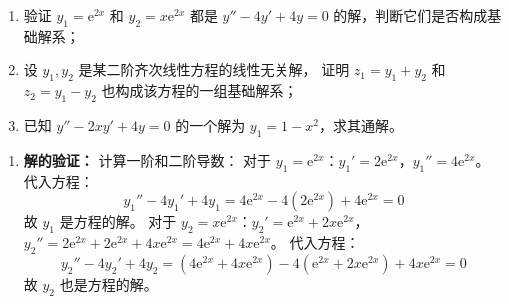 \documentclass[lang=cn,11pt]{elegantbook}
\begin{document}
\begin{exercise}[基础：验证与判定]
\begin{enumerate}
  \item[(1)] 验证 $y_1=\mathrm{e}^{2x}$ 和 $y_2=x\mathrm{e}^{2x}$ 都是
        $y''-4y'+4y=0$ 的解，判断它们是否构成基础解系；
  \item[(2)] 设 $y_1,y_2$ 是某二阶齐次线性方程的线性无关解，
        证明 $z_1=y_1+y_2$ 和 $z_2=y_1-y_2$ 也构成该方程的一组基础解系；
  \item[(3)] 已知 $y''-2xy'+4y=0$ 的一个解为 $y_1=1-x^2$，求其通解。
\end{enumerate}
\end{exercise}
\begin{solution}
\begin{enumerate}
  \item[(1)] \textbf{解的验证：}
  计算一阶和二阶导数：
  对于 $y_1 = \mathrm{e}^{2x}$：$y_1' = 2\mathrm{e}^{2x}$，$y_1'' = 4\mathrm{e}^{2x}$。
  代入方程：
  \[
  y_1'' - 4y_1' + 4y_1 = 4\mathrm{e}^{2x} - 4(2\mathrm{e}^{2x}) + 4\mathrm{e}^{2x} = 0
  \]
  故 $y_1$ 是方程的解。
  对于 $y_2 = x\mathrm{e}^{2x}$：$y_2' = \mathrm{e}^{2x} + 2x\mathrm{e}^{2x}$，$y_2'' = 2\mathrm{e}^{2x} + 2\mathrm{e}^{2x} + 4x\mathrm{e}^{2x} = 4\mathrm{e}^{2x} + 4x\mathrm{e}^{2x}$。
  代入方程：
  \[
  y_2'' - 4y_2' + 4y_2 = (4\mathrm{e}^{2x} + 4x\mathrm{e}^{2x}) - 4(\mathrm{e}^{2x} + 2x\mathrm{e}^{2x}) + 4x\mathrm{e}^{2x} = 0
  \]
  故 $y_2$ 也是方程的解。
  

\end{enumerate}
\end{solution}
\end{document}
